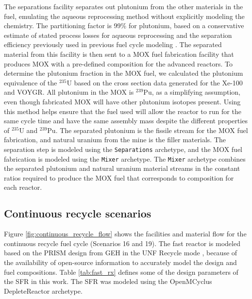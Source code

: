 The separations facility separates out plutonium from the other 
materials in the fuel, emulating the aqueous reprocessing method without 
explicitly modeling the chemistry. The partitioning factor is 99\% for
plutonium, based on a conservative estimate of stated 
process losses for aqueous reprocessing \cite{herbst_6_2011} and the 
separation efficiency previously used in previous fuel cycle modeling 
\cite{wigeland_nuclear_2014,sunny_transition_2015}. The separated 
material from this facility is then sent to a \gls{MOX} fuel fabrication 
facility that produces \gls{MOX} with a pre-defined composition for the 
advanced reactors. To determine the plutonium fraction in the 
\gls{MOX} fuel, we calculated the plutonium equivalence of the $^{235}$U 
based on the cross section data generated for the Xe-100 and VOYGR. All 
plutonium in the \gls{MOX} is $^{239}$Pu, as 
a simplifying assumption, even though 
fabricated \gls{MOX} will have other plutonium isotopes present. Using this 
method helps ensure that the fuel used will allow the 
reactor to run for the same cycle time and have the same assembly mass 
despite the different properties of $^{235}$U and $^{239}$Pu.
The separated plutonium is the fissile stream for the \gls{MOX} 
fuel fabrication, and natural uranium from the mine is the filler 
materials. The separation step is modeled using the \Cycamore 
\texttt{Separations} archetype, and the \gls{MOX} fuel fabrication is modeled 
using the \Cycamore \texttt{Mixer} archetype. The \texttt{Mixer} archetype 
combines the separated plutonium and natural uranium material 
streams in the constant ratios required to produce the \gls{MOX} fuel
that corresponds to composition for each reactor. 

\subsection{Continuous recycle scenarios} \label{sec:continuous}
Figure \ref{fig:continuous_recycle_flow} shows the facilities and material 
flow for the continuous recycle fuel cycle (Scenarios 16 and 19). 
The fast reactor is modeled based on the PRISM design from 
\gls{GEH} in the \gls{UNF} Recycle mode \cite{triplett_prism:_2012}, because of 
the availability of open-source information to accurately model the design
and fuel compositions. Table \ref{tab:fast_rx} defines some of the 
design parameters of the \gls{SFR} in this work. The \gls{SFR} was modeled 
using the OpenMCyclus DepleteReactor archetype. 



